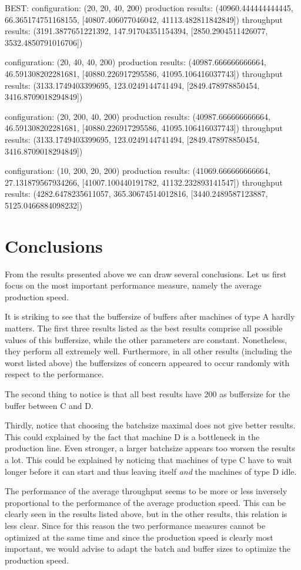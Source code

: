 \documentclass{report}
\begin{document}
BEST:
configuration: (20, 20, 40, 200)
production results: (40960.444444444445, 66.365174751168155, [40807.406077046042, 41113.482811842849])
throughput results: (3191.3877651221392, 147.91704351154394, [2850.2904511426077, 3532.4850791016706])

configuration: (20, 40, 40, 200)
production results: (40987.666666666664, 46.591308202281681, [40880.226917295586, 41095.106416037743])
throughput results: (3133.1749403399695, 123.0249144741494, [2849.478978850454, 3416.8709018294849])

configuration: (20, 200, 40, 200)
production results: (40987.666666666664, 46.591308202281681, [40880.226917295586, 41095.106416037743])
throughput results: (3133.1749403399695, 123.0249144741494, [2849.478978850454, 3416.8709018294849])

configuration: (10, 200, 20, 200)
production results: (41069.666666666664, 27.131879567934266, [41007.100440191782, 41132.232893141547])
throughput results: (4282.6478235611057, 365.30674514012816, [3440.2489587123887, 5125.0466884098232])


\chapter{Conclusions}
From the results presented above we can draw several conclusions.
Let us first focus on the most important performance measure, namely the average production speed.

It is striking to see that the buffersize of buffers after machines of type A hardly matters.
The first three results listed as the best results comprise all possible values of this buffersize, while the other parameters are constant.
Nonetheless, they perform all extremely well.
Furthermore, in all other results (including the worst listed above) the buffersizes of concern appeared to occur randomly with respect to the performance.

The second thing to notice is that all best results have 200 as buffersize for the buffer between C and D.

Thirdly, notice that choosing the batchsize maximal does not give better results.
This could explained by the fact that machine D is a bottleneck in the production line.
Even stronger, a larger batchsize appears too worsen the results a lot.
This could be explained by noticing that machines of type C have to wait longer before it can start and thus leaving itself \emph{and} the machines of type D idle.


The performance of the average throughput seems to be more or less inversely proportional to the performance of the average production speed.
This can be clearly seen in the results listed above, but in the other results, this relation is less clear. Since for this reason the two performance measures cannot be optimized at the same time and since the production speed is clearly most important, we would advise to adapt the batch and buffer sizes to optimize the production speed.
\end{document}

